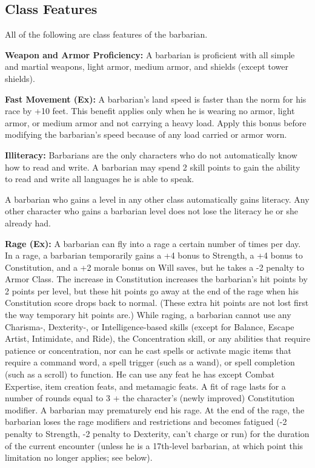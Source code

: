 \documentclass{article}
\begin{document}
\vspace{12pt}
\subsection*{\textbf{Class Features}}

All of the following are class features of the barbarian.

\textbf{Weapon and Armor Proficiency:} A barbarian is proficient with all simple 
and martial weapons, light armor, medium armor, and shields (except tower shields).

\textbf{Fast Movement (Ex):} A barbarian's land speed is faster than the norm for 
his race by +10 feet. This benefit applies only when he is wearing no armor, light 
armor, or medium armor and not carrying a heavy load. Apply this bonus before modifying 
the barbarian's speed because of any load carried or armor worn.

\textbf{Illiteracy:} Barbarians are the only characters who do not automatically 
know how to read and write. A barbarian may spend 2 skill points to gain the ability 
to read and write all languages he is able to speak.

A barbarian who gains a level in any other class automatically gains literacy. 
Any other character who gains a barbarian level does not lose the literacy he or 
she already had.

\textbf{Rage (Ex):} A barbarian can fly into a rage a certain number of times per 
day. In a rage, a barbarian temporarily gains a +4 bonus to Strength, a +4 bonus 
to Constitution, and a +2 morale bonus on Will saves, but he takes a -2 penalty 
to Armor Class. The increase in Constitution increases the barbarian's hit points 
by 2 points per level, but these hit points go away at the end of the rage when 
his Constitution score drops back to normal. (These extra hit points are not lost 
first the way temporary hit points are.) While raging, a barbarian cannot use any 
Charisma-, Dexterity-, or Intelligence-based skills (except for Balance, Escape 
Artist, Intimidate, and Ride), the Concentration skill, or any abilities that require 
patience or concentration, nor can he cast spells or activate magic items that 
require a command word, a spell trigger (such as a wand), or spell completion (such 
as a scroll) to function. He can use any feat he has except Combat Expertise, item 
creation feats, and metamagic feats. A fit of rage lasts for a number of rounds 
equal to 3 + the character's (newly improved) Constitution modifier. A barbarian 
may prematurely end his rage. At the end of the rage, the barbarian loses the rage 
modifiers and restrictions and becomes fatigued (-2 penalty to Strength, -2 penalty 
to Dexterity, can't charge or run) for the duration of the current encounter (unless 
he is a 17th-level barbarian, at which point this limitation no longer applies; 
see below).
\end{document}
